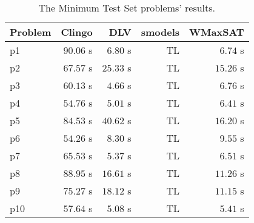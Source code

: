 \documentclass[]{article}
\begin{document}
\begin{table}[h]
\caption{The Minimum Test Set problems' results.}
\label{tab:minimum_test_set_results}
\vspace{1em}
\scriptsize
\centering
\begin{tabular}{lrrrr}
\toprule
Problem & Clingo & DLV & smodels & WMaxSAT \\
\midrule
p1 & $ 90.06 $ s & $ 6.80 $ s & TL & $ \mathbf{6.74} $ s \\
p2 & $ 67.57 $ s & $ 25.33 $ s & TL & $ \mathbf{15.26} $ s \\
p3 & $ 60.13 $ s & $ \mathbf{4.66} $ s & TL & $ 6.76 $ s \\
p4 & $ 54.76 $ s & $ \mathbf{5.01} $ s & TL & $ 6.41 $ s \\
p5 & $ 84.53 $ s & $ 40.62 $ s & TL & $ \mathbf{16.20} $ s \\
p6 & $ 54.26 $ s & $ \mathbf{8.30} $ s & TL & $ 9.55 $ s \\
p7 & $ 65.53 $ s & $ \mathbf{5.37} $ s & TL & $ 6.51 $ s \\
p8 & $ 88.95 $ s & $ 16.61 $ s & TL & $ \mathbf{11.26} $ s \\
p9 & $ 75.27 $ s & $ 18.12 $ s & TL & $ \mathbf{11.15} $ s \\
p10 & $ 57.64 $ s & $ \mathbf{5.08} $ s & TL & $ 5.41 $ s \\
\bottomrule
\end{tabular}
\end{table}



\end{document}
